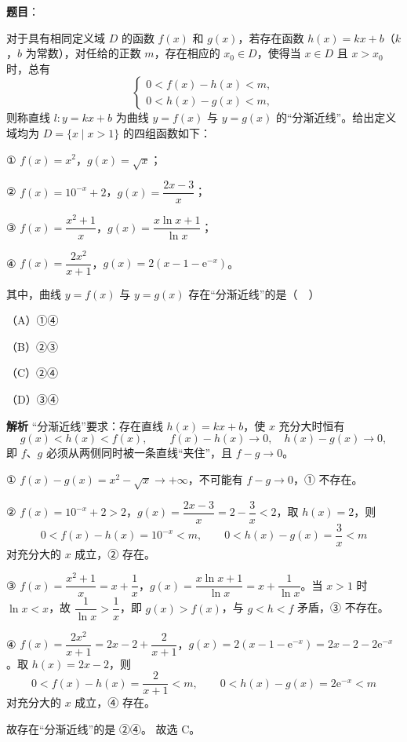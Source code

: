 \begin{answer}

\textbf{题目}：

对于具有相同定义域 $D$ 的函数 $f(x)$ 和 $g(x)$，若存在函数 $h(x)=kx+b$（$k$，$b$ 为常数），对任给的正数 $m$，存在相应的 $x_0\in D$，使得当 $x\in D$ 且 $x>x_0$ 时，总有
\nopagebreak[4]
\[\begin{cases}0<f(x)-h(x)<m,\\0<h(x)-g(x)<m,\end{cases}\]
则称直线 $l\colon y=kx+b$ 为曲线 $y=f(x)$ 与 $y=g(x)$ 的“分渐近线”。给出定义域均为 $D=\{x\mid x>1\}$ 的四组函数如下：

① $f(x)=x^2$，$g(x)=\sqrt x$；

② $f(x)=10^{-x}+2$，$g(x)=\dfrac{2x-3}{x}$；

③ $f(x)=\dfrac{x^2+1}{x}$，$g(x)=\dfrac{x\ln x+1}{\ln x}$；

④ $f(x)=\dfrac{2x^2}{x+1}$，$g(x)=2\left(x-1-\mathrm{e}^{-x}\right)$。

其中，曲线 $y=f(x)$ 与 $y=g(x)$ 存在“分渐近线”的是（　）

（A）①④

（B）②③

（C）②④

（D）③④

\textbf{解析}
“分渐近线”要求：存在直线 $h(x)=kx+b$，使 $x$ 充分大时恒有
\nopagebreak[4]
\[g(x)<h(x)<f(x),\qquad f(x)-h(x)\to0,\quad h(x)-g(x)\to0,\]
即 $f$、$g$ 必须从两侧同时被一条直线“夹住”，且 $f-g\to0$。

① $f(x)-g(x)=x^2-\sqrt x\to+\infty$，不可能有 $f-g\to0$，① 不存在。

② $f(x)=10^{-x}+2>2$，$g(x)=\dfrac{2x-3}{x}=2-\dfrac3x<2$，取 $h(x)=2$，则
\nopagebreak[4]
\[0<f(x)-h(x)=10^{-x}<m,\qquad 0<h(x)-g(x)=\frac3x<m\]
对充分大的 $x$ 成立，② 存在。

③ $f(x)=\dfrac{x^2+1}{x}=x+\dfrac1x$，$g(x)=\dfrac{x\ln x+1}{\ln x}=x+\dfrac1{\ln x}$。当 $x>1$ 时 $\ln x<x$，故 $\dfrac1{\ln x}>\dfrac1x$，即 $g(x)>f(x)$，与 $g<h<f$ 矛盾，③ 不存在。

④ $f(x)=\dfrac{2x^2}{x+1}=2x-2+\dfrac{2}{x+1}$，$g(x)=2\left(x-1-\mathrm e^{-x}\right)=2x-2-2\mathrm e^{-x}$。取 $h(x)=2x-2$，则
\nopagebreak[4]
\[0<f(x)-h(x)=\frac{2}{x+1}<m,\qquad 0<h(x)-g(x)=2\mathrm e^{-x}<m\]
对充分大的 $x$ 成立，④ 存在。

故存在“分渐近线”的是 ②④。
故选 C。


\end{answer}
